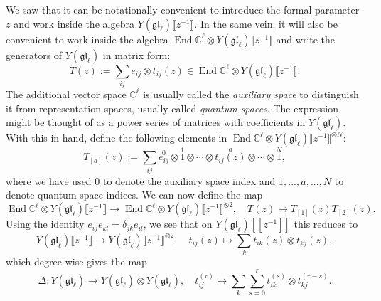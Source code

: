 \documentclass[11pt]{report}
\theoremstyle{definition}
\theoremstyle{remark}
\theoremstyle{remark}
\newcommand{\End}{\operatorname{End}}
\newcommand{\C}{\mathbb{C}}
\begin{document}
We saw that it can be notationally convenient to introduce the formal parameter $z$ and work inside the algebra $Y(\mathfrak{gl}_\ell)\llbracket z^{-1} \rrbracket$. In the same vein, it will also be convenient to work inside the algebra $\End \C^\ell \otimes Y(\mathfrak{gl}_\ell)\llbracket z^{-1} \rrbracket$ and write the generators of $Y(\mathfrak{gl}_\ell)$ in matrix form:
\begin{equation*}
T(z) := \sum_{ij} e_{ij} \otimes t_{ij}(z) \in \End \C^\ell \otimes Y(\mathfrak{gl}_\ell)\llbracket z^{-1} \rrbracket.
\end{equation*}
The additional vector space $\C^\ell$ is usually called the \emph{auxiliary space} to distinguish it from representation spaces, usually called \emph{quantum spaces}. The expression might be thought of as a power series of matrices with coefficients in $Y(\mathfrak{gl}_\ell)$. With this in hand, define the following elements in $\End \C^\ell \otimes Y(\mathfrak{gl}_\ell)\llbracket z^{-1} \rrbracket^{\otimes N}$:
\begin{equation*}
T_{[a]}(z) := \sum_{ij} \overset{0}{e_{ij}} \otimes \overset{1}{1} \otimes \cdots \otimes \overset{a}{t_{ij}(z)} \otimes \cdots \otimes \overset{N}{1},
\end{equation*}
where we have used $0$ to denote the auxiliary space index and $1,...,a,...,N$ to denote quantum space indices. We can now define the map
\begin{equation*}
\End \C^\ell \otimes Y(\mathfrak{gl}_\ell)\llbracket z^{-1} \rrbracket \to \End \C^\ell \otimes Y(\mathfrak{gl}_\ell)\llbracket z^{-1} \rrbracket^{\otimes 2}, \quad T(z) \mapsto T_{[1]}(z) T_{[2]}(z).
\end{equation*}
Using the identity $e_{ij} e_{kl} = \delta_{jk} e_{il}$, we see that on $Y(\mathfrak{gl}_\ell)[[z^{-1}]]$ this reduces to
\begin{equation*}
Y(\mathfrak{gl}_\ell)\llbracket z^{-1} \rrbracket \to Y(\mathfrak{gl}_\ell)\llbracket z^{-1} \rrbracket^{\otimes 2}, \quad t_{ij}(z) \mapsto \sum_k t_{ik}(z) \otimes t_{kj}(z),
\end{equation*}
which degree-wise gives the map
\begin{equation}\label{equation:coproduct}
\Delta: Y(\mathfrak{gl}_\ell) \to Y(\mathfrak{gl}_\ell) \otimes Y(\mathfrak{gl}_\ell), \quad t_{ij}^{(r)} \mapsto \sum_k \sum_{s=0}^r t_{ik}^{(s)} \otimes t_{kj}^{(r-s)}.
\end{equation}
\end{document}
